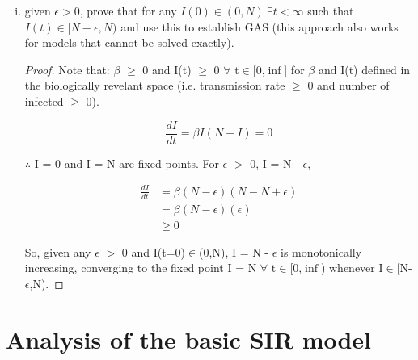 \documentclass[12pt]{article}
\begin{document}
\begin{enumerate}[(a)]
\begin{enumerate}[(i)]
{\begin{proof}
{	This is the exact solution of ~\eqref{E:SI}. Taking the limit as $t \rightarrow \infty$ and using L'Hôpital's rule gives

	\begin{align}
		\lim_{t\to\infty} \frac{NI_0e^{\beta Nt}}{N+I_0(e^{\beta Nt} -1)} &= \lim_{t\to\infty} \frac{N^{\cancel 2} \cancel{\beta I_0e^{\beta Nt}}}{\cancel{N \beta I_0e^{\beta Nt}} } \\
													    &= N
	\end{align}
}
\end{proof}
}

\item given $\epsilon>0$, prove that for any $I(0)\in(0,N)\ \exists t<\infty$ such that $I(t)\in[N-\epsilon,N)$ and use this to establish GAS (this approach also works for models that cannot be solved exactly).

{\color{blue}
\begin{proof}
{\color{magenta}
	
Note that: $\beta$ $\geq$ 0 and I(t) $\geq$ 0 $\forall$ t$\in$[0,$\inf$] for $\beta$ and I(t) defined in the biologically revelant space (i.e. transmission rate $\geq$ 0 and number of infected $\geq$ 0).

\begin{equation}
\frac{dI}{dt} = \beta I(N-I) = 0 
\end{equation}

$\therefore$ I = 0 and I = N are fixed points. For $\epsilon$ $>$ 0, I = N - $\epsilon$,

\begin{align}
\frac{dI}{dt} &= \beta (N-\epsilon)(N-N+\epsilon) \\
&= \beta (N-\epsilon)(\epsilon) \\
&\geq 0
\end{align}

So, given any $\epsilon$ $>$ 0 and I(t=0)$\in$(0,N), I = N - $\epsilon$ is monotonically increasing, converging to the fixed point I = N $\forall$ t$\in$[0,$\inf$) whenever I$\in$[N-$\epsilon$,N).

}
\end{proof}
}

\end{enumerate}
\end{enumerate}

\section{Analysis of the basic SIR  model}
\end{document}

